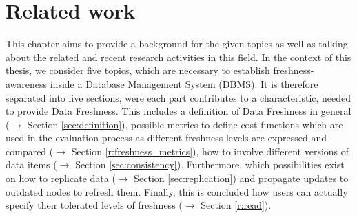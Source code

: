 
\chapter{Related work}
\label{c:related}

This chapter aims to provide a background for the given topics as well as talking about the related and recent research 
activities in this field. In the context of this thesis, we consider five topics, which are necessary to establish 
freshness-awareness inside a Database Management System (DBMS).
It is therefore separated into five sections, were each part contributes to a characteristic, needed to 
provide Data Freshness. This includes a definition of Data Freshness in general ($\rightarrow$ Section \ref{sec:definition}), 
possible metrics to define cost functions which are used
in the evaluation process as different freshness-levels are expressed and compared ($\rightarrow$ Section \ref{r:freshness_metrics}), 
how to involve different versions of data items ($\rightarrow$ Section \ref{sec:consistency}). 
Furthermore, which possibilities exist on how to replicate data ($\rightarrow$ Section \ref{sec:replication}) 
and propagate updates to outdated nodes to refresh them.
Finally, this is concluded how users can actually specify their tolerated levels of freshness ($\rightarrow$ Section \ref{r:read}).




